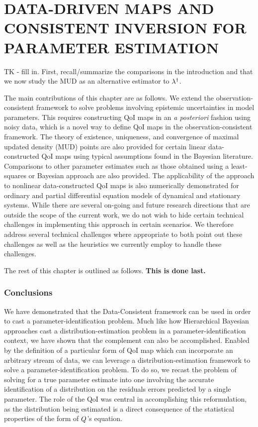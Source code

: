 \chapter{\uppercase{Data-Driven Maps and Consistent Inversion For Parameter Estimation} \label{chapter:mud}}

TK - fill in. First, recall/summarize the comparisons in the introduction and that we now study the MUD as an alternative estimator to $\lambda^\dagger$.

The main contributions of this chapter are as follows.
We extend the observation-consistent framework to solve problems involving epistemic uncertainties in model parameters.
This requires constructing QoI maps in an {\em a posteriori} fashion using noisy data, which is a novel way to define QoI maps in the observation-consistent framework.
The theory of existence, uniqueness, and convergence of maximal updated density (MUD) points are also provided for certain linear data-constructed QoI maps using typical assumptions found in the Bayesian literature.
Comparisons to other parameter estimates such as those obtained using a least-squares or Bayesian approach are also provided.
The applicability of the approach to nonlinear data-constructed QoI maps is also numerically demonstrated for ordinary and partial differential equation models of dynamical and stationary systems.
While there are several on-going and future research directions that are outside the scope of the current work, we do not wish to hide certain technical challenges in implementing this approach in certain scenarios.
We therefore address several technical challenges where appropriate to both point out these challenges as well as the heuristics we currently employ to handle these challenges.


The rest of this chapter is outlined as follows.
{\bf This is done last.}



\subsection{Conclusions}
We have demonstrated that the Data-Consistent framework can be used in order to cast a parameter-identification problem.
Much like how Hierarchical Bayesian approaches cast a distribution-estimation problem in a parameter-identification context, we have shown that the complement can also be accomplished.
Enabled by the definition of a particular form of QoI map which can incorporate an arbitrary stream of data, we can leverage a distribution-estimation framework to solve a parameter-identification problem.
To do so, we recast the problem of solving for a true parameter estimate into one involving the accurate identification of a distribution on the residuals errors predicted by a single parameter.
The role of the QoI was central in accomplishing this reformulation, as the distribution being estimated is a direct consequence of the statistical properties of the form of $Q$'s equation.

